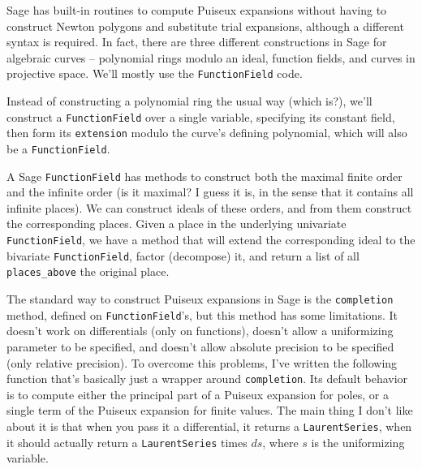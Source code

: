 \begin{comment}
# for f in test_curves:
#     analyze_multiple_points(f)
\end{sageblock}


$$y^3 - 3axy + x^3$$

This function contains an extra variable and is, in fact, a family of
algebraic curves.

\endexample

\end{comment}


\vfill\eject
{}

Sage has built-in routines to compute Puiseux expansions without having to
construct Newton polygons and substitute trial expansions, although a
different syntax is required.  In fact, there are three different
constructions in Sage for algebraic curves -- polynomial rings
modulo an ideal, function fields, and curves in projective space.
We'll mostly use the {\tt FunctionField} code.

Instead of constructing a polynomial ring the usual way (which is?), we'll
construct a {\tt FunctionField} over a single variable, specifying its
constant field, then form its {\tt extension} modulo the curve's defining polynomial,
which will also be a {\tt FunctionField}.

A Sage {\tt FunctionField} has methods to construct both the maximal finite order
and the infinite order (is it maximal?  I guess it is, in the sense that it contains
all infinite places).  We can construct ideals of these orders, and from them
construct the corresponding places.  Given a place in the underlying univariate
{\tt FunctionField}, we have a method that will extend the corresponding ideal
to the bivariate {\tt FunctionField}, factor (decompose) it, and return a list
of all {\tt places\_above} the original place.

The standard way to construct Puiseux expansions in Sage is the {\tt completion} method,
defined on {\tt FunctionField}'s,
but this method has some limitations.  It doesn't work on
differentials (only on functions), doesn't allow a uniformizing parameter to be
specified, and doesn't allow absolute precision to be specified (only relative precision).
To overcome this problems, I've written the following function that's basically just
a wrapper around {\tt completion}.  Its default behavior is to compute either
the principal part of a Puiseux expansion for poles, or a single term of the Puiseux
expansion for finite values.
The main thing I don't like about it is that
when you pass it a differential, it returns a {\tt LaurentSeries}, when it should actually
return a {\tt LaurentSeries} times $ds$, where $s$ is the uniformizing variable.

